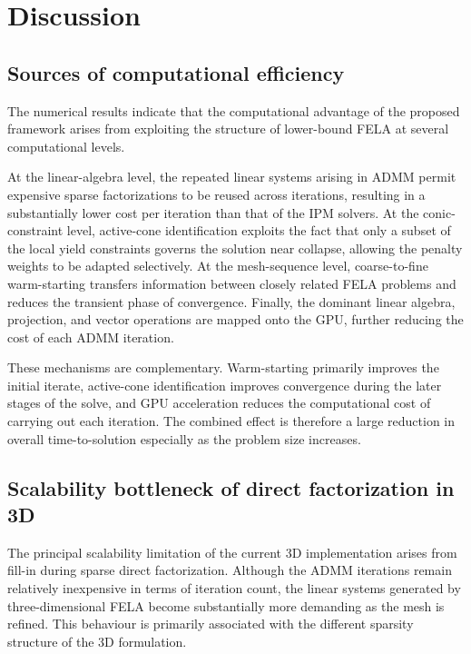 
\section{Discussion}

\subsection{Sources of computational efficiency}

The numerical results indicate that the computational advantage of the proposed framework arises from exploiting the structure of lower-bound FELA at several computational levels.

At the linear-algebra level, the repeated linear systems arising in ADMM permit expensive sparse factorizations to be reused across iterations, resulting in a substantially lower cost per iteration than that of the IPM solvers. At the conic-constraint level, active-cone identification exploits the fact that only a subset of the local yield constraints governs the solution near collapse, allowing the penalty weights to be adapted selectively. At the mesh-sequence level, coarse-to-fine warm-starting transfers information between closely related FELA problems and reduces the transient phase of convergence. Finally, the dominant linear algebra, projection, and vector operations are mapped onto the GPU, further reducing the cost of each ADMM iteration.

These mechanisms are complementary. Warm-starting primarily improves the initial iterate, active-cone identification improves convergence during the later stages of the solve, and GPU acceleration reduces the computational cost of carrying out each iteration. The combined effect is therefore a large reduction in overall time-to-solution especially as the problem size increases.

\subsection{Scalability bottleneck of direct factorization in 3D}
\label{sec:3D_scalability}

The principal scalability limitation of the current 3D implementation arises from fill-in during sparse direct factorization. Although the ADMM iterations remain relatively inexpensive in terms of iteration count, the linear systems generated by three-dimensional FELA become substantially more demanding as the mesh is refined. This behaviour is primarily associated with the different sparsity structure of the 3D formulation.

